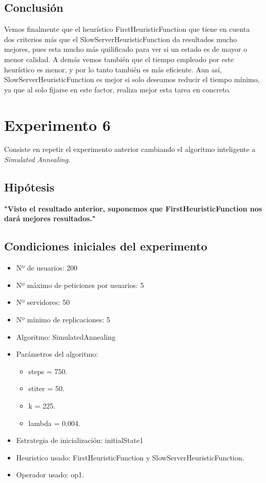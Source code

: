 \documentclass[a4paper,10pt]{report}
\begin{document}
		
		\subsection*{Conclusión}
		Vemos finalmente que el heurístico FirstHeuristicFunction que tiene en cuenta dos criterios más que el SlowServerHeuristicFunction da resultados mucho mejores, pues esta mucho más quilificado para ver si un estado es de mayor o menor calidad. A demás vemos también que el tiempo empleado por este heurístico es menor, y por lo tanto también es más eficiente. Aun así, SlowServerHeuristicFunction es mejor si solo deseamos reducir el tiempo mínimo, ya que al solo fijarse en este factor, realiza mejor esta tarea en concreto.
		
		
	\newpage
	\section*{Experimento 6}

		Consiste en repetir el experimento anterior cambiando el algoritmo inteligente a \textit{Simulated Annealing}.

        \subsection*{Hipótesis}
		\textbf{"Visto el resultado anterior, suponemos que FirstHeuristicFunction nos dará mejores resultados."}

		\subsection*{Condiciones iniciales del experimento}
		\begin{itemize}
		    \item Nº de usuarios: 200
    		\item Nº máximo de peticiones por usuarios: 5
    		\item Nº servidores: 50
    		\item Nº mínimo de replicaciones: 5
    		\item Algoritmo: SimulatedAnnealing
    		\item Parámetros del algoritmo: 
    		\begin{itemize}
    		    \item steps = 750.
    		    \item stiter = 50.
    		    \item k = 225.
    		    \item lambda = 0.004.
    		\end{itemize}
    		\item Estrategia de inicialización: initialState1
    		\item Heuristico usado: FirstHeuristicFunction y
    		SlowServerHeuristicFunction.
    		\item Operador usado: op1.
		\end{itemize}
\end{document}
